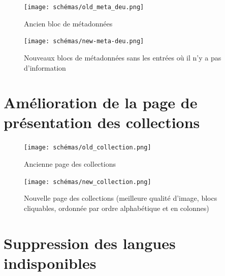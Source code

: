 \begin{figure}[H]
\centering
\begin{minipage}{.5\textwidth}
  \centering
  \texttt{[image: schémas/old\_meta\_deu.png]}
  \caption{Ancien bloc de métadonnées}
  \label{old-meta-deu}
\end{minipage}%
\begin{minipage}{.5\textwidth}
  \centering
  \texttt{[image: schémas/new-meta-deu.png]}
  \caption{Nouveaux blocs de métadonnées sans les entrées où il n'y a pas d'information}
  \label{new-meta-deu}
\end{minipage}
\end{figure}

\newpage

\section{Amélioration de la page de présentation des collections}
\label{old_collection}
\begin{figure}[H]
        \centering
        \texttt{[image: schémas/old\_collection.png]}
        \caption{Ancienne page des collections}
        \label{fig:schémas22}
    \end{figure}
\label{new_collection}
\begin{figure}[H]
        \centering
        \texttt{[image: schémas/new\_collection.png]}
        \caption{Nouvelle page des collections (meilleure qualité d'image, blocs cliquables, ordonnée par ordre alphabétique et en colonnes)}
        \label{fig:schémas23}
    \end{figure}

\newpage

\section{Suppression des langues indisponibles}

